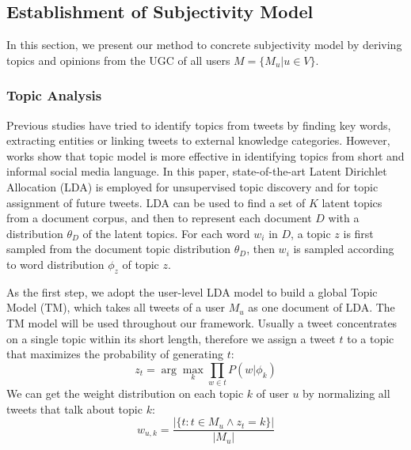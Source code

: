 \documentclass[letterpaper]{article}
\begin{document}
 
\subsection{Establishment of Subjectivity Model}
\label{establishment}

In this section, we present our method to concrete subjectivity model by deriving topics and opinions from the UGC of all users $ M=\lbrace M_{u}\vert u \in V\rbrace$.

\subsubsection{Topic Analysis}
\label{topic}

Previous studies have tried to identify topics from tweets by finding key words\cite{chen2010short}, extracting  entities\cite{abel2011analyzing} or linking tweets to external knowledge categories\cite{macskassy2011people}. However, works show that topic model is more effective in identifying topics from short and informal social media language\cite{hong2010empirical}. In this paper, state-of-the-art Latent Dirichlet Allocation (LDA)\cite{blei2003latent} is employed for unsupervised topic discovery and for topic assignment of future tweets. LDA can be used to find a set of $ K $ latent topics from a document corpus, and then to represent each document $ D $ with a distribution $ \theta_{D} $ of the latent topics. For each word $ w_{i} $ in $ D $, a topic $ z $ is first sampled from the document topic distribution $ \theta_{D} $, then $ w_{i} $ is sampled according to word distribution $ \phi_{z} $ of topic $ z $. 

As the first step, we adopt the user-level LDA model to build a global Topic Model (TM), which takes all tweets of a user $M_u$ as one document of LDA\cite{hong2010empirical}. The TM model will be used throughout our framework. 
Usually a tweet concentrates on a single topic within its short length, therefore we assign a tweet $ t $ to a topic that maximizes the probability of generating $ t $:
\begin{equation}
\label{twtopic}
z_{t} = \arg \max_{k}\prod_{w \in t} P(w|\phi_{k})
\end{equation}
We can get the weight distribution on each topic $ k $ of user $ u $ by normalizing all tweets that talk about topic $ k $: 
\begin{equation}
w_{u,k}=\dfrac{|\{ t: t \in M_{u} \wedge z_{t}=k\}|}{|M_{u}|}
\end{equation}
\end{document}
